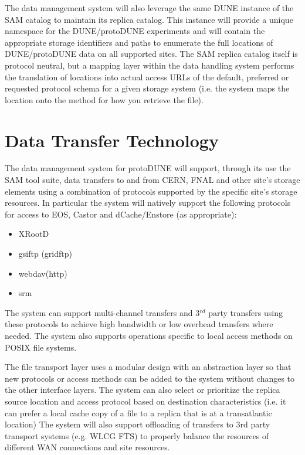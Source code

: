 \documentclass[12pt]{article}
\newcommand{\pd}{protoDUNE\xspace}
\begin{document}
The data management system will also leverage the same DUNE instance of the SAM catalog to maintain its
replica catalog.  This instance will provide a unique namespace for the DUNE/\pd experiments and will
contain the appropriate storage identifiers and paths to enumerate the full locations of  DUNE/\pd data
on all supported sites.  The SAM replica catalog itself is protocol neutral, but a mapping layer within the
data handling system performs the translation of locations into actual access URLs of the default, preferred
or requested protocol schema for a given storage system (i.e. the system maps the location onto the method
for how you retrieve the file).

\section{Data Transfer Technology}

The data management system for \pd will support, through its use the SAM tool suite,  data transfers to and from CERN,
FNAL and other site’s storage elements using a combination of protocols supported by the specific site's storage resources.
In particular the system will natively support the following protocols for access to EOS, Castor and dCache/Enstore (as appropriate):
\begin{itemize}
\item XRootD
\item gsiftp (gridftp)
\item webdav(http)
\item srm
\end{itemize}

\noindent The system can support multi-channel transfers and 3$^{rd}$ party transfers
using these protocols to achieve high bandwidth or low overhead transfers where needed.  The system also supports operations
specific to local access methods on POSIX file systems.  

The file transport layer uses a modular design with an abstraction layer so that new protocols or access methods can be added to the system without changes to the other interface layers.  The system can also select or prioritize the replica source location and access protocol based on destination characteristics (i.e. it can prefer a local cache copy of a file to a replica that is at a transatlantic location)  The system will also support offloading of transfers to 3rd party transport systems (e.g. WLCG FTS) to properly balance the resources of different WAN connections and site resources.
\end{document}
